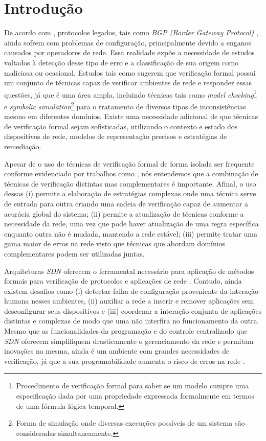 \documentclass[12pt]{article}
\begin{document}
\section{Introdução}  %

De acordo com \cite{Feamster_2005}, protocolos legados, tais como \textit{BGP (Border Gateway Protocol)} \cite{569372}, ainda sofrem com problemas de configuração, principalmente devido a enganos causados por operadores de rede.
Essa realidade expõe a necessidade de estudos voltados à detecção desse tipo de erro e a classificação de sua origem como maliciosa ou ocasional. Estudos tais como \cite{6679403} sugerem que verificação formal possui um conjunto de técnicas capaz de verificar ambientes de rede e responder essas questões, já que é uma área ampla, incluindo técnicas tais como \textit{model checking}\footnote{Procedimento de verificação formal para saber se um modelo cumpre uma especificação dada por uma propriedade expressada formalmente em termos de uma fórmula lógica temporal.} e \textit{symbolic simulation}\footnote{Forma de simulação onde diversas execuções possíveis de um sistema são consideradas simultaneamente.} para o tratamento de diversos tipos de inconsistências mesmo em diferentes domínios. Existe uma necessidade adicional de que técnicas de verificação formal sejam sofisticadas, utilizando o contexto e estado dos dispositivos de rede, modelos de representação precisos e estratégias de remediação.

Apesar de o uso de técnicas de verificação formal de forma isolada ser frequente conforme evidenciado por trabalhos como \cite{Ball_2014}, nós entendemos que a combinação de técnicas de verificação distintas mas complementares é importante.
Afinal, o uso dessas (i) permite a elaboração de estratégias complexas onde uma técnica serve de entrada para outra criando uma cadeia de verificação capaz de aumentar a acurácia global do sistema; (ii) permite a atualização de técnicas conforme a necessidade da rede, uma vez que pode haver atualização de uma regra específica enquanto outra não é mudada, mantendo a rede estável; (iii) permite tratar uma gama maior de erros na rede visto que técnicas que abordam domínios complementares podem ser utilizadas juntas.

Arquiteturas \textit{SDN} oferecem o ferramental necessário para aplicação de métodos formais para verificação de protocolos e aplicações de rede \cite{6873212}.
Contudo, ainda existem desafios como (i) detectar falha de configuração proveniente da interação humana nesses ambientes, (ii) auxiliar a rede a inserir e remover aplicações sem desconfigurar seus dispositivos e (iii) coordenar a interação conjunta de aplicações distintas e complexas de modo que uma não interfira no funcionamento da outra. Mesmo que as funcionalidades da programação e do controle centralizado que \textit{SDN} oferecem simplifiquem drasticamente o gerenciamento da rede e permitam inovações na mesma, ainda é um ambiente com grandes necessidades de verificação, já que a sua programabilidade aumenta o risco de erros na rede \cite{8691107}.
\end{document}
